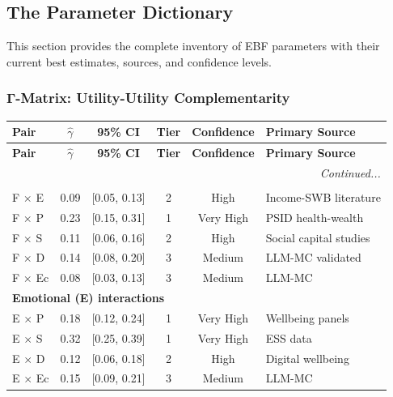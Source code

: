 \subsection{The Parameter Dictionary}
\label{sec:BBB-dictionary}

This section provides the complete inventory of EBF parameters with their 
current best estimates, sources, and confidence levels.

\subsubsection{Γ-Matrix: Utility-Utility Complementarity}

\begin{longtable}{lccccl}
\toprule
\textbf{Pair} & \textbf{$\hat{\gamma}$} & \textbf{95\% CI} & \textbf{Tier} & \textbf{Confidence} & \textbf{Primary Source} \\
\midrule
\endfirsthead
\toprule
\textbf{Pair} & \textbf{$\hat{\gamma}$} & \textbf{95\% CI} & \textbf{Tier} & \textbf{Confidence} & \textbf{Primary Source} \\
\midrule
\endhead
\midrule
\multicolumn{6}{r}{\textit{Continued...}} \\
\endfoot
\bottomrule
\endlastfoot

\multicolumn{6}{l}{\textbf{Financial (F) interactions}} \\
F $\times$ E & 0.09 & [0.05, 0.13] & 2 & High & Income-SWB literature \\
F $\times$ P & 0.23 & [0.15, 0.31] & 1 & Very High & PSID health-wealth \\
F $\times$ S & 0.11 & [0.06, 0.16] & 2 & High & Social capital studies \\
F $\times$ D & 0.14 & [0.08, 0.20] & 3 & Medium & LLM-MC validated \\
F $\times$ Ec & 0.08 & [0.03, 0.13] & 3 & Medium & LLM-MC \\
\midrule

\multicolumn{6}{l}{\textbf{Emotional (E) interactions}} \\
E $\times$ P & 0.18 & [0.12, 0.24] & 1 & Very High & Wellbeing panels \\
E $\times$ S & 0.32 & [0.25, 0.39] & 1 & Very High & ESS data \\
E $\times$ D & 0.12 & [0.06, 0.18] & 2 & High & Digital wellbeing \\
E $\times$ Ec & 0.15 & [0.09, 0.21] & 3 & Medium & LLM-MC \\
\midrule


\end{longtable}
